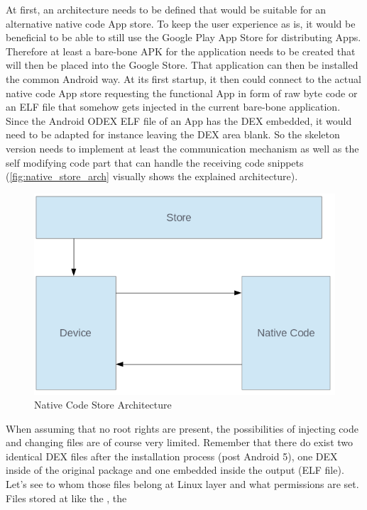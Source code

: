 At first, an architecture needs to be defined that would be suitable for an alternative native code App store. To keep the user experience as is, it would be beneficial to be able to still use the Google Play App Store for distributing Apps. Therefore at least a bare-bone APK for the application needs to be created that will then be placed into the Google Store.
That application can then be installed the common Android way. At its first startup, it then could connect to the actual native code App store
requesting the functional App in form of raw byte code or an ELF file that
somehow gets injected in the current bare-bone application.
Since the Android ODEX ELF file of an App has the DEX embedded, it would need to be adapted for instance leaving the DEX area blank.
So the skeleton version needs to implement at least the communication mechanism as well as the self modifying code part that can handle the receiving code snippets (\autoref{fig:native_store_arch} visually shows
the explained architecture).
\begin{figure}[htb]
  \centering
  \includegraphics[scale=0.5]{figures/native_store_arch}
  \caption[Native Code Store Architecture]{Native Code Store Architecture}
  \label{fig:native_store_arch}
\end{figure}
When assuming that no root rights are present, the possibilities of injecting code and changing files are of course very limited. Remember that there do exist two identical DEX files after the installation process (post Android 5), one DEX inside of the original  package and one embedded inside the  output (ELF file).
Let's see to whom those files belong at Linux layer and what permissions are set. Files stored at  like the , the 

